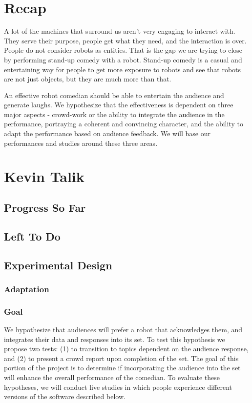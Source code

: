 \documentclass[onecolumn, draftclsnofoot,10pt, compsoc]{IEEEtran}
\begin{document}
\section{Recap}

A lot of the machines that surround us aren't very engaging to interact with. They serve their purpose, people get what they need, and the interaction is over. People do not consider robots as entities. That is the gap we are trying to close by performing stand-up comedy with a robot. Stand-up comedy is a casual and entertaining way for people to get more exposure to robots and see that robots are not just objects, but they are much more than that.

An effective robot comedian should be able to entertain the audience and generate laughs. We hypothesize that the effectiveness is dependent on three major aspects - crowd-work or the ability to integrate the audience in the performance, portraying a coherent and convincing character, and the ability to adapt the performance based on audience feedback. We will base our performances and studies around these three areas.

\section{Kevin Talik}
\subsection{Progress So Far}
\subsection{Left To Do}
\subsection{Experimental Design}
\subsubsection{Adaptation}
\subsubsection{Goal}
  We hypothesize that audiences will prefer a robot that acknowledges them, and integrates their data and responses into its set. To test this hypothesis we propose two tests: (1) to transition to topics dependent on the
  audience response, and (2) to present a crowd report upon completion of the set. The goal of this portion of the project is to determine if incorporating the audience into the set will enhance the overall performance of the comedian. To evaluate these hypotheses, we will conduct live studies in which people experience different versions of the software described below.
  
\end{document}
